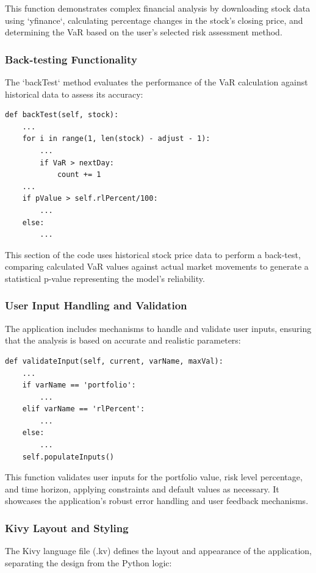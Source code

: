 \documentclass{article}
\begin{document}
This function demonstrates complex financial analysis by downloading stock data using `yfinance`, calculating percentage changes in the stock's closing price, and determining the VaR based on the user's selected risk assessment method.

\subsubsection{Back-testing Functionality}
The `backTest` method evaluates the performance of the VaR calculation against historical data to assess its accuracy:

\begin{verbatim}
def backTest(self, stock):
    ...
    for i in range(1, len(stock) - adjust - 1):
        ...
        if VaR > nextDay:
            count += 1
    ...
    if pValue > self.rlPercent/100:
        ...
    else:
        ...
\end{verbatim}

This section of the code uses historical stock price data to perform a back-test, comparing calculated VaR values against actual market movements to generate a statistical p-value representing the model's reliability.

\subsubsection{User Input Handling and Validation}
The application includes mechanisms to handle and validate user inputs, ensuring that the analysis is based on accurate and realistic parameters:

\begin{verbatim}
def validateInput(self, current, varName, maxVal):
    ...
    if varName == 'portfolio':
        ...
    elif varName == 'rlPercent':
        ...
    else:
        ...
    self.populateInputs()
\end{verbatim}

This function validates user inputs for the portfolio value, risk level percentage, and time horizon, applying constraints and default values as necessary. It showcases the application's robust error handling and user feedback mechanisms.

\subsubsection{Kivy Layout and Styling}
The Kivy language file (.kv) defines the layout and appearance of the application, separating the design from the Python logic:
\end{document}
